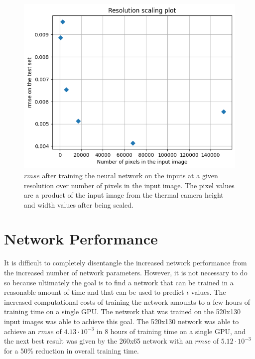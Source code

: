 \begin{figure}[!htb]
    \centering
    \includegraphics[width = \textwidth]{images/resolution-scaling.png}
    \caption{$rmse$ after training the neural network on the inputs at a given resolution over number of pixels in the input image. The pixel values are a product of the input image from the thermal camera height and width values after being scaled.} \label{fig:resolution-scaling}
\end{figure}

\section{Network Performance}

It is difficult to completely disentangle the increased network performance from the increased number of network parameters. However, it is not necessary to do so because ultimately the goal is to find a network that can be trained in a reasonable amount of time and that can be used to predict $\bar{\iota}$ values. The increased computational costs of training the network amounts to a few hours of training time on a single GPU. The network that was trained on the 520x130 input images was able to achieve this goal. The 520x130 network was able to achieve an $rmse$ of $4.13 \cdot 10^{-3}$ in 8 hours of training time on a single GPU, and the next best result was given by the 260x65 network with an $rmse$ of $5.12 \cdot 10^{-3}$ for a 50\% reduction in overall training time.

